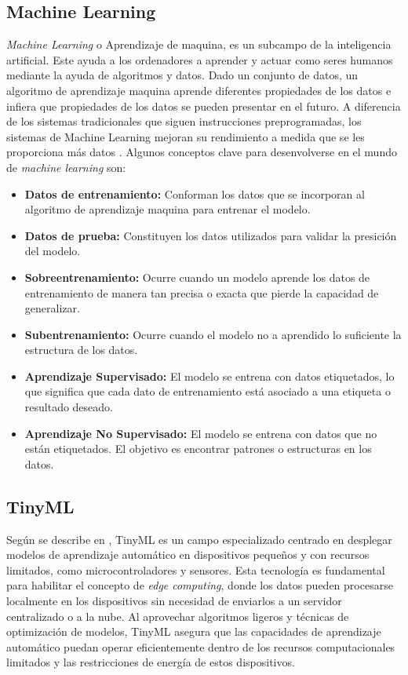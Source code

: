 \subsection{Machine Learning}
\textit{Machine Learning} o Aprendizaje de maquina, es un subcampo de la inteligencia artificial. Este ayuda a los ordenadores a aprender y actuar como seres humanos mediante la ayuda de algoritmos y datos. Dado un conjunto de datos, un algoritmo de aprendizaje maquina aprende diferentes propiedades de los datos e infiera que propiedades de los datos se pueden presentar en el futuro. A diferencia de los sistemas tradicionales que siguen instrucciones preprogramadas, los sistemas de Machine Learning mejoran su rendimiento a medida que se les proporciona más datos \cite{jimenez2021introduccion}. Algunos conceptos clave para desenvolverse en el mundo de \textit{machine learning} son:
\begin{itemize}
    \item \textbf{Datos de entrenamiento:} Conforman los datos que se incorporan al algoritmo de aprendizaje maquina para entrenar el modelo.
    \item \textbf{Datos de prueba:} Constituyen los datos utilizados para validar la presición del modelo.
    \item \textbf{Sobreentrenamiento:} Ocurre cuando un modelo aprende los datos de entrenamiento de manera tan precisa o exacta que pierde la capacidad de generalizar.
    \item \textbf{Subentrenamiento:} Ocurre cuando el modelo no a aprendido lo suficiente la estructura de los datos.
    \item \textbf{Aprendizaje Supervisado:} El modelo se entrena con datos etiquetados, lo que significa que cada dato de entrenamiento está asociado a una etiqueta o resultado deseado.
    \item \textbf{Aprendizaje No Supervisado:} El modelo se entrena con datos que no están etiquetados. El objetivo es encontrar patrones o estructuras en los datos.
\end{itemize}

\subsection{TinyML}
Según se describe en \cite{TML}, TinyML es un campo especializado centrado en desplegar modelos de aprendizaje automático en dispositivos pequeños y con recursos limitados, como microcontroladores y sensores. Esta tecnología es fundamental para habilitar el concepto de \textit{edge computing}, donde los datos pueden procesarse localmente en los dispositivos sin necesidad de enviarlos a un servidor centralizado o a la nube. Al aprovechar algoritmos ligeros y técnicas de optimización de modelos, TinyML asegura que las capacidades de aprendizaje automático puedan operar eficientemente dentro de los recursos computacionales limitados y las restricciones de energía de estos dispositivos.

